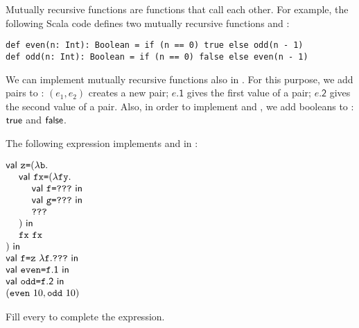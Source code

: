 \begin{exercise}

Mutually recursive functions are functions that call each
other. For example, the following Scala code defines two mutually
recursive functions  and :

\begin{verbatim}
def even(n: Int): Boolean = if (n == 0) true else odd(n - 1)
def odd(n: Int): Boolean = if (n == 0) false else even(n - 1)
\end{verbatim}

We can implement mutually recursive functions also in \plang. For this purpose,
we add pairs to \plang: $(e_1, e_2)$ creates a new pair; $e\textsf{.1}$ gives
the first value of a pair; $e\textsf{.2}$ gives the second value of a pair.
Also, in order to implement  and , we add booleans to
: $\textsf{true}$ and $\textsf{false}$.

The following expression implements  and  in \plang:
\vspace{1em}

$\begin{array}{@{}l@{}}
  \ebind{\cz}{(\efun{\cb}{\\
  \ \ \ \ \ebind{\code{fx}}{(\efun{\code{fy}}{\\
  \ \ \ \ \ \ \ \ \ebind{\cf}{\code{???}}{\\
  \ \ \ \ \ \ \ \ \ebind{\code{g}}{\code{???}}{\\
  \ \ \ \ \ \ \ \ \code{???}}}}\\\ \ \ \ )}{\\
  \ \ \ \ \eapp{\code{fx}}{\code{fx}}}}\\)}{\\
  \ebind{\cf}{\eapp{\cz}{\efun{\cf}{\code{???}}}}{\\
  \ebind{\code{even}}{\cf\textsf{.1}}{\\
  \ebind{\code{odd}}{\cf\textsf{.2}}{\\
  (\eapp{\code{even}}{10}, \eapp{\code{odd}}{10})}}}}
\end{array}$
\vspace{1em}

Fill every  to complete the expression.

\end{exercise}
